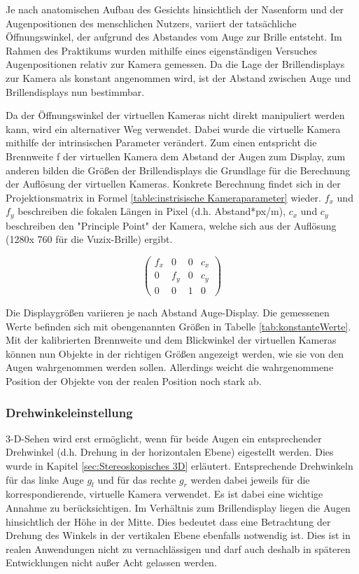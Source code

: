 Je nach anatomischen Aufbau des Gesichts hinsichtlich  der Nasenform und der Augenpositionen des menschlichen Nutzers, variiert der tatsächliche Öffnungswinkel, der aufgrund des Abstandes vom Auge zur Brille entsteht. Im Rahmen des Praktikums wurden mithilfe eines eigenständigen Versuches Augenpositionen relativ zur Kamera gemessen. Da die Lage der Brillendisplays zur Kamera als konstant angenommen wird, ist der Abstand zwischen Auge und Brillendisplays nun bestimmbar.

Da der Öffnungswinkel der virtuellen Kameras nicht direkt manipuliert werden kann, wird ein alternativer Weg verwendet. Dabei wurde die virtuelle Kamera mithilfe der intrinsischen Parameter verändert. Zum einen entspricht die Brennweite f der virtuellen Kamera dem Abstand der Augen zum Display, zum anderen bilden die Größen der Brillendisplays die Grundlage für die Berechnung der Auflösung der virtuellen Kameras. Konkrete Berechnung findet sich in der Projektionsmatrix in Formel \ref{table:instrisische Kameraparameter} wieder. $f_x$ und $f_y$ beschreiben die fokalen Längen in Pixel (d.h. Abstand*px/m), $c_x$ und $c_y$ beschreiben den "Principle Point" der Kamera, welche sich aus der Auflösung (1280x 760 für die Vuzix-Brille) ergibt. 

%

\begin{equation}
\begin{pmatrix}
f_x & 0& 0& c_x \\
0 & f_y & 0 & c_y\\ 
0 & 0&   1 & 0  
\end{pmatrix}
\label{table:instrisische Kameraparameter}
\end{equation}

Die Displaygrößen variieren je nach Abstand Auge-Display. Die gemessenen Werte befinden sich mit obengenannten Größen in Tabelle \ref{tab:konstanteWerte}.
%
Mit der kalibrierten Brennweite und dem Blickwinkel der virtuellen Kameras können nun Objekte in der richtigen Größen angezeigt werden, wie sie von den Augen wahrgenommen werden sollen. Allerdings weicht die wahrgenommene Position der Objekte von der realen Position noch stark ab. 

\subsubsection{Drehwinkeleinstellung}
3-D-Sehen wird erst ermöglicht, wenn für beide Augen ein entsprechender Drehwinkel (d.h. Drehung in der horizontalen Ebene) eigestellt werden. Dies wurde in Kapitel \ref{sec:Stereoskopisches 3D} erläutert.  Entsprechende Drehwinkeln für das linke Auge $g_{l}$ und für das rechte $g_{r}$ werden dabei jeweils für die korrespondierende, virtuelle Kamera verwendet.
Es ist dabei eine wichtige Annahme zu berücksichtigen. Im Verhältnis zum Brillendisplay liegen die Augen hinsichtlich der Höhe in der Mitte. Dies bedeutet dass eine Betrachtung der Drehung des Winkels in der vertikalen Ebene ebenfalls notwendig ist. Dies ist in realen Anwendungen nicht zu vernachlässigen und darf auch deshalb in späteren Entwicklungen nicht außer Acht gelassen werden.


